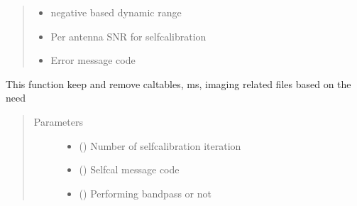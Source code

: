 \documentclass[letterpaper,10pt,english]{sphinxmanual}
\begin{document}
\begin{fulllineitems}
\begin{fulllineitems}
\begin{quote}
\begin{description}
\begin{itemize}
\item {} 
\sphinxAtStartPar
{} \textendash{} negative based dynamic range

\item {} 
\sphinxAtStartPar
{} \textendash{} Per antenna SNR for self\sphinxhyphen{}calibration

\item {} 
\sphinxAtStartPar
{} \textendash{} Error message code

\end{itemize}


\end{description}\end{quote}

\end{fulllineitems}


\begin{fulllineitems}
\label{\detokenize{paircars:paircars.intensity_selfcal_LTS.IntensitySelfcal.file_remover_and_keeper}}
\sphinxAtStartPar
This function keep and remove caltables, ms, imaging related files based on the need
\begin{quote}\begin{description}
\item[{Parameters}] \leavevmode\begin{itemize}
\item {} 
\sphinxAtStartPar
{} () \textendash{} Number of self\sphinxhyphen{}calibration iteration

\item {} 
\sphinxAtStartPar
{} () \textendash{} Selfcal message code

\item {} 
\sphinxAtStartPar
{} () \textendash{} Performing bandpass or not


\end{itemize}
\end{description}
\end{quote}
\end{fulllineitems}
\end{fulllineitems}
\end{document}
